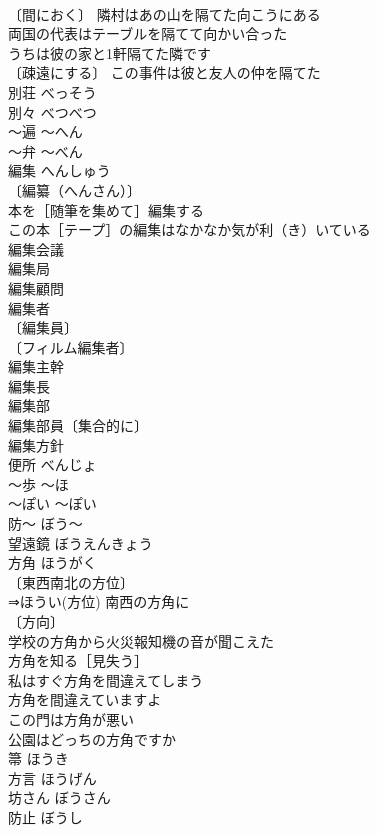 \documentclass[8pt]{extreport}
\begin{document}
\begin{CJK}{UTF8}{min}
\\	〔間におく〕 隣村はあの山を隔てた向こうにある 
\\	両国の代表はテーブルを隔てて向かい合った 
\\	うちは彼の家と1軒隔てた隣です 
\\	〔疎遠にする〕 この事件は彼と友人の仲を隔てた 
\\	別荘	べっそう	
\\	別々	べつべつ	
\\	～遍	～へん	
\\	～弁	～べん	
\\	編集	へんしゅう	
\\	〔編纂（へんさん）〕
\\	本を［随筆を集めて］編集する 
\\	この本［テープ］の編集はなかなか気が利（き）いている 
\\	編集会議 
\\	編集局 
\\	編集顧問 
\\	編集者 
\\	〔編集員〕
\\	〔フィルム編集者〕
\\	編集主幹 
\\	編集長 
\\	編集部 
\\	編集部員〔集合的に〕 
\\	編集方針 
\\	便所	べんじょ	
\\	～歩	～ほ	
\\	～ぽい	～ぽい	
\\	防～	ぼう～	
\\	望遠鏡	ぼうえんきょう	
\\	方角	ほうがく	
\\	〔東西南北の方位〕
\\	⇒ほうい(方位) 南西の方角に 
\\	〔方向〕
\\	学校の方角から火災報知機の音が聞こえた 
\\	方角を知る［見失う］ 
\\	私はすぐ方角を間違えてしまう 
\\	方角を間違えていますよ 
\\	この門は方角が悪い 
\\	公園はどっちの方角ですか 
\\	箒	ほうき	
\\	方言	ほうげん	
\\	坊さん	ぼうさん	
\\	防止	ぼうし	

\end{CJK}
\end{document}
